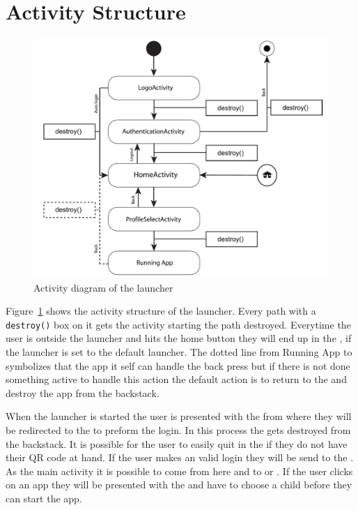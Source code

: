 \section{Activity Structure}

\begin{figure}[h!]
	\centering
	\includegraphics[width=1\textwidth]{gfx/activityDiagram.pdf}
	\caption{Activity diagram of the launcher}
	\label{fig:activity_diagram}
\end{figure}
Figure~\ref{fig:activity_diagram} shows the activity structure of the \giraf[] launcher. Every path with a \verb+destroy()+ box on it gets the activity starting the path destroyed. Everytime the user is outside the launcher and hits the home button they will end up in the , if the \giraf[] launcher is set to the default launcher.
The dotted line from Running App to  symbolizes that the app it self can handle the back press but if there is not done something active to handle this action the default action is to return to the  and destroy the app from the backstack.

When the launcher is started the user is presented with the  from where they will be redirected to the  to preform the login. In this process the  gets destroyed from the backstack.
It is possible for the user to easily quit in the  if they do not have their QR code at hand. If the user makes an valid login they will be send to the . As the main activity it is possible to come from here and to  or . If the user clicks on an app they will be presented with the  and have to choose a child before they can start the app.


